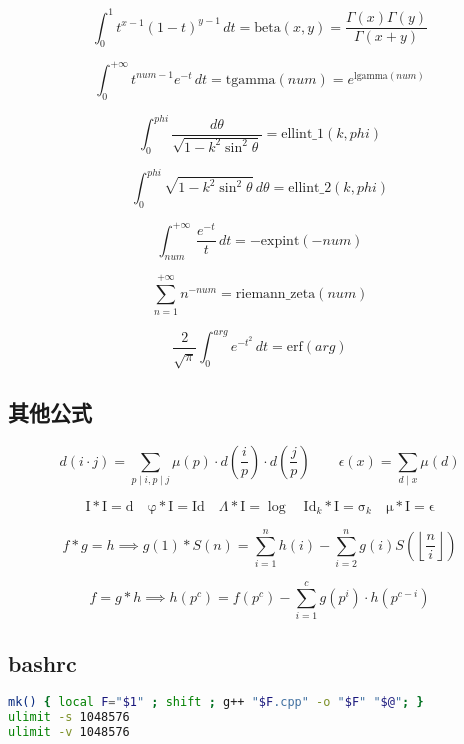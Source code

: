 \documentclass[a4paper,landscape,twocolumn]{ctexart}
\begin{document}
$$
\int_0^1 t^{x-1}(1-t)^{y-1}\,dt = \mathrm{beta}(x,y) = \frac{\Gamma(x)\Gamma(y)}{\Gamma(x+y)}
$$

$$
\int_0^{+\infty} t^{num-1}e^{-t}\,dt = \mathrm{tgamma}(num) = e^{\mathrm{lgamma}(num)}
$$

$$
\int_0^{phi} \frac{d\theta}{\sqrt{1-k^2\sin^2\theta}} = \mathrm{ellint\_1}(k,phi)
$$

$$
\int_0^{phi} \sqrt{1-k^2\sin^2\theta}\,d\theta = \mathrm{ellint\_2}(k,phi)
$$

$$
\int_{num}^{+\infty} \frac{e^{-t}}{t}\,dt = -\mathrm{expint}(-num)
$$

$$
\sum_{n=1}^{+\infty} n^{-num} = \mathrm{riemann\_zeta}(num)
$$

$$
\frac{2}{\sqrt{\pi}}\int_0^{arg} e^{-t^2}\,dt = \mathrm{erf}(arg)
$$

%

\subsection{其他公式}


$$
d(i \cdot j) = \sum_{p \mid i, p \mid j} \mu (p) \cdot d (\frac{i}{p}) \cdot d (\frac{j}{p})
\qquad
\epsilon (x) = \sum \limits_{d \mid x} \mu (d)
$$

$$
\mathrm{I} * \mathrm{I} = \mathrm{d}
\quad
\mathrm{\varphi} * \mathrm{I} = \mathrm{Id}
\quad
\Lambda * \mathrm{I} = \log
\quad
\mathrm{Id}_k * \mathrm{I} = \mathrm{\sigma}_k
\quad
\mathrm{\mu} * \mathrm{I} = \mathrm{\epsilon}
$$

$$
f * g = h \implies g(1) * S(n) = \sum_{i = 1}^{n} h(i) - \sum_{i = 2}^{n} g(i) S(\left \lfloor \frac{n}{i} \right \rfloor)
$$

$$
f = g * h \implies h(p ^ c) = f(p ^ c) - \sum_{i = 1}^{c} g(p ^ i) \cdot h(p ^ {c-i})
$$

\subsection{bashrc}

\begin{lstlisting}[language=sh]
mk() { local F="$1" ; shift ; g++ "$F.cpp" -o "$F" "$@"; }
ulimit -s 1048576
ulimit -v 1048576
\end{lstlisting}
\end{document}
